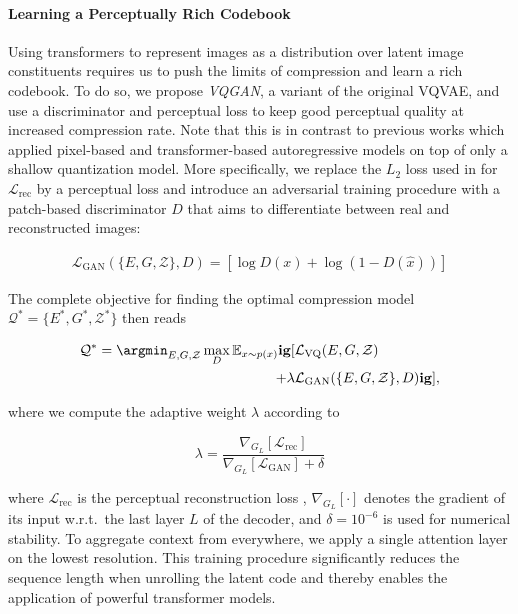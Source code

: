 \paragraph{Learning a Perceptually Rich Codebook} Using transformers to represent images as a distribution over latent image constituents requires us to push the limits of compression and learn a rich codebook. To do so, we propose \emph{VQGAN}, a variant of the original VQVAE, and use a discriminator and perceptual loss \cite{larsen2015autoencoding,johnson2016perceptual,lamb2016discriminative,dosovitskiy2016generating,mentzer2020highfidelity} to keep good perceptual quality at increased compression rate. Note that this is in contrast to previous works which applied pixel-based \cite{oord2016conditional,razavi2019generating} and transformer-based autoregressive models \cite{chen2020generative} on top of only a shallow quantization model. More specifically, we replace the $L_2$ loss used in \cite{oord2018neural} for $\mathcal{L}_{\text{rec}}$
by a perceptual loss and introduce an adversarial training procedure with a patch-based discriminator $D$ \cite{isola2017image} that aims to differentiate between real and reconstructed images:

\begin{align}

\mathcal{L}_{\text{GAN}}(\{E, G, \mathcal{Z} \}, D) =
  \left[ \log D(x) + \log (1 - D(\hat{x}))\right]
\label{eq:ourvqloss}
\end{align}

The complete objective for finding the optimal compression model $\mathcal{Q}^* = \{E^*, G^*, \mathcal{Z}^* \}$ then reads

\begin{align}

\mathcal{Q}^* = \argmin_{E, G, \mathcal{Z}} \max_{D}
  \mathbb{E}_{x\sim p(x)} \mathbf{ig}[
    &\mathcal{L}_{\text{VQ}}(E, G, \mathcal{Z}) \nonumber \\
    + \lambda &\mathcal{L}_{\text{GAN}}(\{E, G, \mathcal{Z} \}, D)
    \mathbf{ig}],
\end{align}

where we compute the adaptive weight $\lambda$ according to

\begin{equation}
\lambda = \frac{\nabla_{G_L}[ \mathcal{L}_{\text{rec}} ]}{\nabla_{G_L} [\mathcal{L}_{\text{GAN}}] + \delta}
\end{equation}

where $\mathcal{L}_{\text{rec}}$ is the perceptual reconstruction loss \cite{zhang2018perceptual}, $\nabla_{G_L}[\cdot]$ denotes the gradient of its input
w.r.t.\ the last layer $L$ of the decoder, and $\delta = 10^{-6}$ is used for numerical stability. To aggregate context from everywhere, we apply a single attention layer on the lowest resolution. This training procedure significantly reduces the sequence length when unrolling the latent code and thereby enables the application of powerful transformer models.

